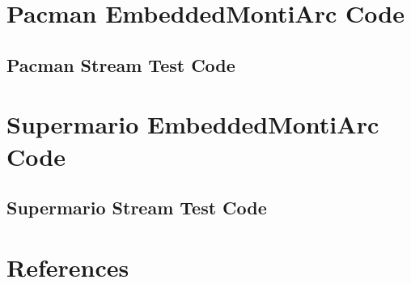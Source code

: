 \documentclass{elsarticle}
\begin{document}
\newpage
\appendix
\section{Pacman EmbeddedMontiArc Code}

\subsection{Pacman Stream Test Code}


\newpage
\section{Supermario EmbeddedMontiArc Code}

\subsection{Supermario Stream Test Code}


\newpage
\section*{References}

\end{document}
